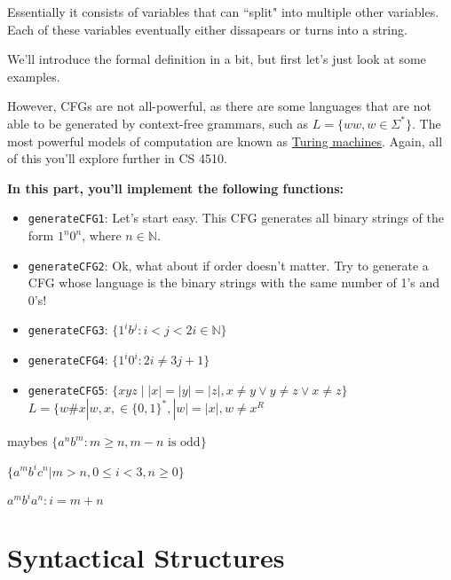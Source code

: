 \documentclass{article}
\begin{document}
    Essentially it consists of variables that can ``split" into multiple other variables. Each of these variables eventually either dissapears or turns into a string.
    
    
    We'll introduce the formal definition in a bit, but first let's just look at some examples. 


    However, CFGs are not all-powerful, as there are some languages that are not able to be generated by context-free grammars, such as $L = \{ww, w \in \Sigma^{*}\}$. The most powerful models of computation are known as \href{https://www.google.com/doodles/alan-turings-100th-birthday}{Turing machines}. Again, all of this you'll explore further in CS 4510.

\begin{tcolorbox}[enhanced,interior style={top color=Dandelion!20,bottom color=Dandelion!30}]
    \textbf{In this part, you'll implement the following functions:}
    \begin{itemize}
        \item \lstinline{generateCFG1}: Let's start easy. This CFG generates all binary strings of the form $1^{n}0^{n}$, where $n \in \mathbb{N}$.
        \item \lstinline{generateCFG2}: Ok, what about if order doesn't matter. Try to generate a CFG whose language is the binary strings with the same number of 1's and 0's!
        \item \lstinline{generateCFG3}: $\{1^{i}b^{j} : i < j < 2i \in \mathbb{N}\}$
        \item \lstinline{generateCFG4}: $\{1^{i}0^{i} : 2i \ne 3j + 1\}$
        \item \lstinline{generateCFG5}: $\{xyz \mid |x|=|y|=|z|, x\neq y \lor y \neq z \lor x \neq z\}$
        $ L = \{w\#x | w, x, \in \{0, 1\}^{*}, |w| = |x|, w \ne x^{R}$
    \end{itemize}
\end{tcolorbox}

maybes
$\{a^{n}b^{m} : m \ge n, m - n \text{ is odd}\}$

$\{a^{m}b^{i}c^{n} | m > n, 0 \le i < 3, n \ge 0\}$

$a^{m}b^{i}a^{n} : i = m + n$



\section*{Syntactical Structures}
\end{document}
